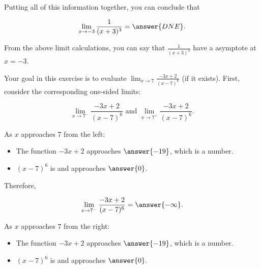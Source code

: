 \documentclass[handout]{ximera}
\begin{document}
\begin{exercise}
Putting all of this information together, you can conclude that

\[ \lim_{x \to -3} \frac{1}{(x+3)^3} = \answer{DNE}. \]

\begin{exercise}

From the above limit calculations, you can say that $\frac{1}{(x+3)^3}$  have a  asymptote at $x =-3$. 

\end{exercise}

\end{exercise}

\begin{exercise}
Your goal in this exercise is to evaluate $\displaystyle\lim_{x \to 7} \frac{-3x+2}{(x-7)^6}$ (if it exists).  First, consider the corresponding one-sided limits:

$$\displaystyle\lim_{x \to 7^-} \frac{-3x+2}{(x-7)^6} \text{ and } \displaystyle\lim_{x \to 7^+} \frac{-3x+2}{(x-7)^6}.$$

As $x$ approaches $7$ from the left:  

\begin{itemize}

\item The function $-3x+2$ approaches $\answer{-19}$, which is a  number. 

\item $(x-7)^6$ is  and approaches $\answer{0}$.

\end{itemize}

Therefore, 

 \[ \displaystyle\lim_{x \to 7^-} \frac{-3x+2}{(x-7)^6} = \answer{-\infty}.\]
 
As $x$ approaches $7$ from the right: 

\begin{itemize}

\item The function $-3x+2$ approaches $\answer{-19}$, which is a  number. 

\item $(x-7)^6$ is  and approaches $\answer{0}.$


\end{itemize}
\end{exercise}
\end{document}

